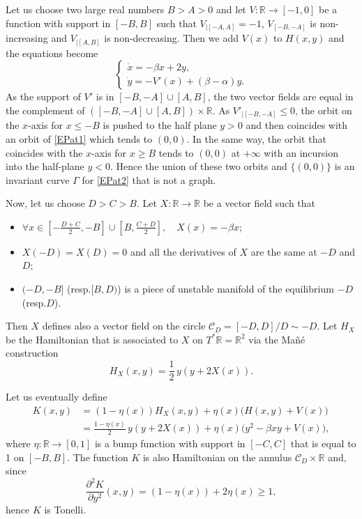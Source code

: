 \documentclass[11pt]{article}
\newcommand{\resp}{resp.\xspace}
\numberwithin{equation}{section}
\numberwithin{figure}{section}
\numberwithin{table}{section}
\theoremstyle{definition}
\def\R{\mathbb{R}}
\begin{document}
Let us choose two large real numbers $B>A>0$ and let $V:\R\to [-1, 0]$ be a function with support in $[-B, B]$ such that $V_{|[-A, A]}=-1$, $V_{[-B, -A]}$ is non-increasing and $V_{|[A, B]}$ is non-decreasing. Then we add $V(x)$ to $H(x,y)$ and the equations become
\begin{equation}\label{EPat2}\begin{cases}
\dot x=-\beta x+2y,\\
\dot y=-V'(x)+(\beta-\alpha) y.
\end{cases}\end{equation}
As the support of $V'$ is in $[-B, -A]\cup [A,B]$, the two vector fields are equal in the complement of $([-B, -A]\cup [A, B])\times \R$. As $V'_{|[-B, -A]}\leq 0$, the orbit on the $x$-axis for $x\leq -B$ is pushed to the half plane $y>0$ and then coincides with an orbit of \eqref{EPat1} which tends to $(0, 0)$. In the same way, the orbit that coincides with the $x$-axis for $x\geq B$ tends to $(0, 0)$ at $+\infty$ with an incursion into the half-plane $y<0$. Hence the union of these two orbits and $\{ (0, 0)\}$ is an invariant curve $\Gamma$ for \eqref{EPat2} that is not a graph.

Now, let us choose $D>C>B$. Let $X:\R\to \R$ be a vector field such that
\begin{itemize}
\item $\forall x\in [-\frac{D+C}{2}, -B]\cup [B, \frac{C+D}{2}],\quad X(x)=-\beta x$;
\item $X(-D)=X(D)=0$ and all the derivatives of $X$ are the same at $-D$ and $D$;
\item $(-D, -B]$ (\resp $[B, D)$) is a piece of unstable manifold of the equilibrium $-D$ (\resp $D$).
\end{itemize}
Then $X$ defines also a vector field on the circle ${\mathcal C}_D=[-D, D]/D\sim -D$. Let $H_X$ be the Hamiltonian that is associated to $X$ on $T^*\R=\R^2$ via the Mañé construction
\[
H_X(x, y)=\frac{1}{2}\,y(y+2X(x)).
\]

Let us eventually define
\begin{align*}
K(x,y)&=(1-\eta (x))H_X(x,y)+\eta(x)\big(H(x,y)+V(x)\big)
\\
&=\frac{1-\eta (x)}{2}\,y(y+2X(x))+\eta(x)\big(y^2-\beta xy+V(x)\big),
\end{align*}
where $\eta:\R\to [0, 1]$ is a bump function with support in $[-C, C]$ that is equal to 1 on $[-B, B]$. The function $K$ is also Hamiltonian on the annulus $ {\mathcal C}_D\times \R$ and, since
\[
\frac{\partial^2K}{\partial y^2}(x, y)=(1-\eta(x))+2\eta(x)\geq 1,
\]
hence $K$ is Tonelli.
\end{document}
